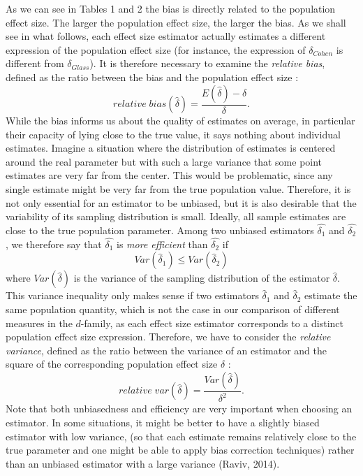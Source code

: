 \documentclass[
  english,
  man,floatsintext]{apa6}
\begin{document}
As we can see in Tables 1 and 2 the bias is directly related to the population effect size. The larger the population effect size, the larger the bias. As we shall see in what follows, each effect size estimator actually estimates a different expression of the population effect size (for instance, the expression of \(\delta_{Cohen}\) is different from \(\delta_{Glass}\)). It is therefore necessary to examine the \emph{relative bias}, defined as the ratio between the bias and the population effect size :
\begin{equation} 
relative \; bias(\hat{\delta})=\frac{E(\hat{\delta})-\delta}{\delta}.
\label{eqn:RELBIAS}
\end{equation}
While the bias informs us about the quality of estimates on average, in particular their capacity of lying close to the true value, it says nothing about individual estimates. Imagine a situation where the distribution of estimates is centered around the real parameter but with such a large variance that some point estimates are very far from the center. This would be problematic, since any single estimate might be very far from the true population value. Therefore, it is not only essential for an estimator to be unbiased, but it is also desirable that the variability of its sampling distribution is small. Ideally, all sample estimates are close to the true population parameter. Among two unbiased estimators \(\hat{\delta_1}\) and \(\hat{\delta_2}\), we therefore say that \(\hat{\delta_1}\) is \emph{more efficient} than \(\hat{\delta_2}\) if
\begin{equation} 
Var(\hat{\delta}_1) \leq Var(\hat{\delta}_2)
\label{eqn:EFFICIENCY}
\end{equation}
where \(Var(\hat{\delta})\) is the variance of the sampling distribution of the estimator \(\hat{\delta}\). This variance inequality only makes sense if two estimators \(\hat{\delta}_1\) and \(\hat{\delta}_2\) estimate the same population quantity, which is not the case in our comparison of different measures in the \(d\)-family, as each effect size estimator corresponds to a distinct population effect size expression. Therefore, we have to consider the \emph{relative variance}, defined as the ratio between the variance of an estimator and the square of the corresponding population effect size \(\delta\) :
\begin{equation} 
relative \; var(\hat{\delta})=\frac{Var(\hat{\delta})}{\delta^2}.
\label{eqn:RELVAR}
\end{equation}
Note that both unbiasedness and efficiency are very important when choosing an estimator. In some situations, it might be better to have a slightly biased estimator with low variance, (so that each estimate remains relatively close to the true parameter and one might be able to apply bias correction techniques) rather than an unbiased estimator with a large variance (Raviv, 2014).
\end{document}
